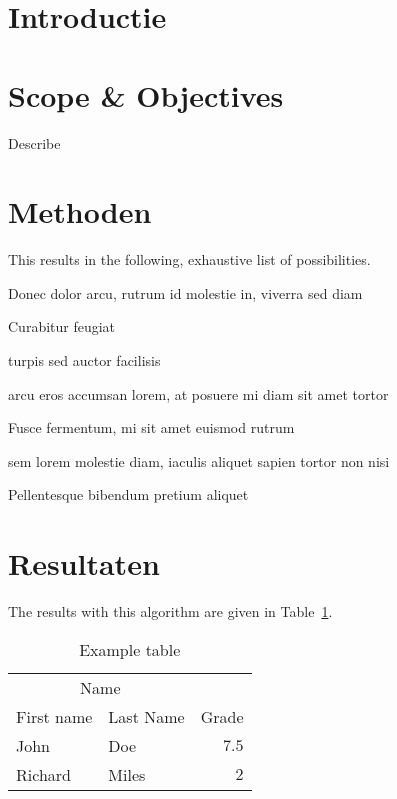 \documentclass[twoside]{article}
\begin{document}
\begin{multicols}{2} %



\section{Introductie}

\lipsum[2-3] %


\section{Scope \& Objectives}

Describe \lipsum[1] %

\section{Methoden}
This results in the following, exhaustive list of possibilities. 
\begin{compactitem}
\item Donec dolor arcu, rutrum id molestie in, viverra sed diam
\item Curabitur feugiat
\item turpis sed auctor facilisis
\item arcu eros accumsan lorem, at posuere mi diam sit amet tortor
\item Fusce fermentum, mi sit amet euismod rutrum
\item sem lorem molestie diam, iaculis aliquet sapien tortor non nisi
\item Pellentesque bibendum pretium aliquet
\end{compactitem}
\lipsum[4] %

\section{Resultaten}

The results with this algorithm are given in Table~\ref{table:example}.
\begin{table}[H]
\caption{Example table}\label{table:example}
\centering
\begin{tabular}{llr}
\toprule
\multicolumn{2}{c}{Name} \\
\cmidrule(r){1-2}
First name & Last Name & Grade \\
\midrule
John & Doe & $7.5$ \\
Richard & Miles & $2$ \\
\bottomrule
\end{tabular}
\end{table}



\end{multicols}
\end{document}
